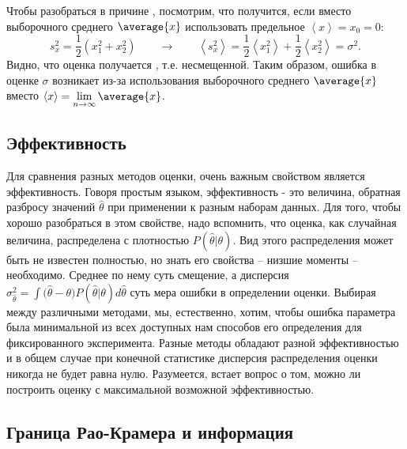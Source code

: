 {    Чтобы разобраться в причине ,
    посмотрим, что получится, если вместо выборочного среднего $\average{x}$
    использовать предельное $\left\langle x\right\rangle =x_{0}=0$:
    \[
    s_{x}^{2}=\frac{1}{2}\left(x_{1}^{2}+x_{2}^{2}\right)\qquad\to\qquad\left\langle s_{x}^{2}\right\rangle =\frac{1}{2}\left\langle x_{1}^{2}\right\rangle +\frac{1}{2}\left\langle x_{2}^{2}\right\rangle =\sigma^{2}.
    \]
    Видно, что оценка получается ,
    т.е. несмещенной. Таким образом, ошибка в оценке $\sigma$ возникает
    из-за использования выборочного среднего $\average{x}$ вместо 
    $\left\langle x\right\rangle =\lim\limits_{n\to\infty}\average{x}$.
}

\subsection{Эффективность}

Для сравнения разных методов оценки, очень важным свойством является
эффективность. Говоря простым языком, эффективность - это величина,
обратная разбросу значений $\hat{\theta}$ при применении к разным
наборам данных. Для того, чтобы хорошо разобраться в этом свойстве, надо
вспомнить, что оценка, как случайная величина, распределена с плотностью
$P(\hat\theta | \theta)$. Вид этого распределения может быть не
известен полностью, но знать его свойства -- низшие моменты --
необходимо. Среднее по нему суть смещение, а дисперсия
$\sigma_{\hat\theta}^2 = \int{ (\hat\theta - \theta} ) P(\hat\theta | \theta) d\hat\theta$
суть мера ошибки в определении оценки. Выбирая между различными
методами, мы, естественно, хотим, чтобы ошибка параметра была
минимальной из всех доступных нам способов его определения для
фиксированного эксперимента. Разные методы обладают разной
эффективностью и в общем случае при конечной статистике дисперсия
распределения оценки никогда не будет равна нулю. Разумеется, встает
вопрос о том, можно ли построить оценку с максимальной возможной
эффективностью.

\subsection{Граница Рао-Крамера и информация}

